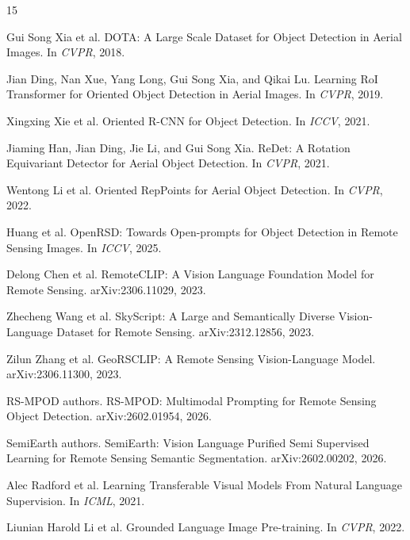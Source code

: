 \documentclass[10pt]{article}
\begin{document}
\begin{thebibliography}{15}

Gui Song Xia et al.
\newblock DOTA: A Large Scale Dataset for Object Detection in Aerial Images.
\newblock In \emph{CVPR}, 2018.

Jian Ding, Nan Xue, Yang Long, Gui Song Xia, and Qikai Lu.
\newblock Learning RoI Transformer for Oriented Object Detection in Aerial Images.
\newblock In \emph{CVPR}, 2019.

Xingxing Xie et al.
\newblock Oriented R-CNN for Object Detection.
\newblock In \emph{ICCV}, 2021.

Jiaming Han, Jian Ding, Jie Li, and Gui Song Xia.
\newblock ReDet: A Rotation Equivariant Detector for Aerial Object Detection.
\newblock In \emph{CVPR}, 2021.

Wentong Li et al.
\newblock Oriented RepPoints for Aerial Object Detection.
\newblock In \emph{CVPR}, 2022.

Huang et al.
\newblock OpenRSD: Towards Open-prompts for Object Detection in Remote Sensing Images.
\newblock In \emph{ICCV}, 2025.

Delong Chen et al.
\newblock RemoteCLIP: A Vision Language Foundation Model for Remote Sensing.
\newblock arXiv:2306.11029, 2023.

Zhecheng Wang et al.
\newblock SkyScript: A Large and Semantically Diverse Vision-Language Dataset for Remote Sensing.
\newblock arXiv:2312.12856, 2023.

Zilun Zhang et al.
\newblock GeoRSCLIP: A Remote Sensing Vision-Language Model.
\newblock arXiv:2306.11300, 2023.

RS-MPOD authors.
\newblock RS-MPOD: Multimodal Prompting for Remote Sensing Object Detection.
\newblock arXiv:2602.01954, 2026.

SemiEarth authors.
\newblock SemiEarth: Vision Language Purified Semi Supervised Learning for Remote Sensing Semantic Segmentation.
\newblock arXiv:2602.00202, 2026.

Alec Radford et al.
\newblock Learning Transferable Visual Models From Natural Language Supervision.
\newblock In \emph{ICML}, 2021.

Liunian Harold Li et al.
\newblock Grounded Language Image Pre-training.
\newblock In \emph{CVPR}, 2022.


\end{thebibliography}
\end{document}
